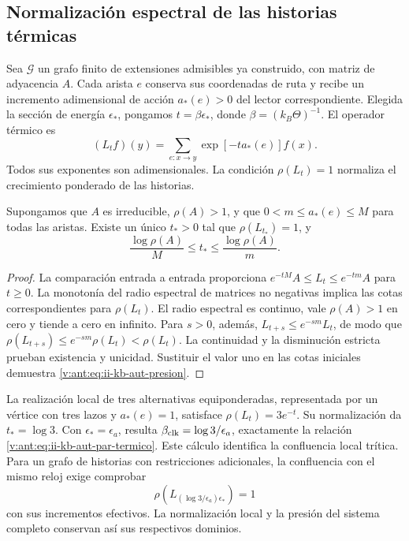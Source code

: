 \subsection{Normalización espectral de las historias térmicas}

Sea \(\mathcal G\) un grafo finito de extensiones admisibles ya
construido, con matriz de adyacencia \(A\). Cada arista \(e\) conserva
sus coordenadas de ruta y recibe un incremento adimensional de acción
\(a_*(e)>0\) del lector correspondiente. Elegida la sección de energía
\(\epsilon_*\), pongamos \(t=\beta\epsilon_*\), donde
\(\beta=(k_B\Theta)^{-1}\). El operador térmico es
\begin{equation}
 (L_tf)(y)=\sum_{e:x\to y}\exp[-t a_*(e)]f(x).
 \label{v:ant:eq:ii-kb-aut-operador}
\end{equation}
Todos sus exponentes son adimensionales. La condición
\(\rho(L_t)=1\) normaliza el crecimiento ponderado de las historias.

\begin{proposition}
Supongamos que \(A\) es irreducible, \(\rho(A)>1\), y que
\(0<m\leq a_*(e)\leq M\) para todas las aristas. Existe un único
\(t_*>0\) tal que \(\rho(L_{t_*})=1\), y
\begin{equation}
 \frac{\log\rho(A)}{M}\leq t_*\leq
 \frac{\log\rho(A)}{m}.
 \label{v:ant:eq:ii-kb-aut-presion}
\end{equation}
\end{proposition}
\begin{proof}
La comparación entrada a entrada proporciona
\(e^{-tM}A\leq L_t\leq e^{-tm}A\) para \(t\geq0\).
La monotonía del radio espectral de matrices no negativas implica
las cotas correspondientes para \(\rho(L_t)\). El radio espectral
es continuo, vale \(\rho(A)>1\) en cero y tiende a cero en infinito.
Para \(s>0\), además,
\(L_{t+s}\leq e^{-sm}L_t\), de modo que
\(\rho(L_{t+s})\leq e^{-sm}\rho(L_t)<\rho(L_t)\).
La continuidad y la disminución estricta prueban existencia y
unicidad. Sustituir el valor uno en las cotas iniciales demuestra
\eqref{v:ant:eq:ii-kb-aut-presion}.
\end{proof}

La realización local de tres alternativas equiponderadas, representada
por un vértice con tres lazos y \(a_*(e)=1\), satisface
\(\rho(L_t)=3e^{-t}\). Su normalización da \(t_*=\log3\).
Con \(\epsilon_*=\epsilon_a\), resulta
\(\beta_{\rm clk}=\log3/\epsilon_a\), exactamente la relación
\eqref{v:ant:eq:ii-kb-aut-par-termico}. Este cálculo identifica la
confluencia local trítica. Para un grafo de historias con restricciones
adicionales, la confluencia con el mismo reloj exige comprobar
\[
 \rho\!\left(L_{(\log3/\epsilon_a)\epsilon_*}\right)=1
\]
con sus incrementos efectivos. La normalización local y la presión
del sistema completo conservan así sus respectivos dominios.

